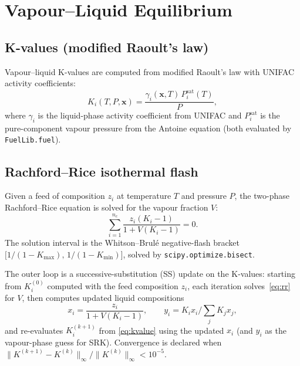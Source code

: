 \documentclass[11pt,letterpaper]{article}
\begin{document}
\section{Vapour--Liquid Equilibrium}
\label{sec:vle}

\subsection{K-values (modified Raoult's law)}
\label{sec:kvalues}

Vapour--liquid K-values are computed from modified Raoult's law with UNIFAC
activity coefficients:
\begin{equation}
  K_i(T, P, \mathbf{x}) = \frac{\gamma_i(\mathbf{x}, T)\, P_i^{\mathrm{sat}}(T)}{P},
  \label{eq:kvalue}
\end{equation}
where $\gamma_i$ is the liquid-phase activity coefficient from UNIFAC and
$P_i^{\mathrm{sat}}$ is the pure-component vapour pressure from the Antoine
equation (both evaluated by \texttt{FuelLib.fuel}).

\subsection{Rachford--Rice isothermal flash}
\label{sec:rr}

Given a feed of composition $z_i$ at temperature $T$ and pressure $P$,
the two-phase Rachford--Rice equation is solved for the vapour fraction $V$:
\begin{equation}
  \sum_{i=1}^{n_c} \frac{z_i(K_i - 1)}{1 + V(K_i - 1)} = 0.
  \label{eq:rr}
\end{equation}
The solution interval is the Whitson--Brul\'e negative-flash bracket
$\bigl[1/(1-K_{\max}),\, 1/(1-K_{\min})\bigr]$, solved by \texttt{scipy.optimize.bisect}.

The outer loop is a successive-substitution (SS) update on the K-values:
starting from $K_i^{(0)}$ computed with the feed composition $z_i$, each
iteration solves~\cref{eq:rr} for $V$, then computes updated liquid compositions
\begin{equation}
  x_i = \frac{z_i}{1 + V(K_i - 1)},
  \qquad
  y_i = K_i x_i \big/ \textstyle\sum_j K_j x_j,
\end{equation}
and re-evaluates $K_i^{(k+1)}$ from \cref{eq:kvalue} using the updated $x_i$
(and $y_i$ as the vapour-phase guess for SRK).  Convergence is declared when
$\|K^{(k+1)} - K^{(k)}\|_\infty / \|K^{(k)}\|_\infty < 10^{-5}$.
\end{document}
